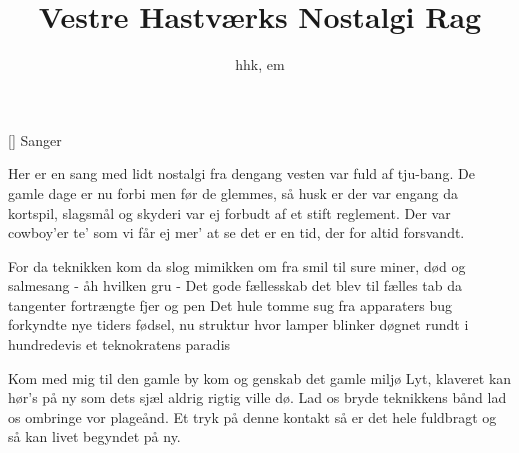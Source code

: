 \documentclass[a4paper,11pt]{article}
\title{Vestre Hastværks Nostalgi Rag}
\author{hhk, em}
\begin{document}
\maketitle

\begin{roles}
  [] Sanger
\end{roles}

\begin{song}
  Her er en sang med lidt nostalgi
  fra dengang vesten var fuld af tju-bang.
  De gamle dage er nu forbi
  men før de glemmes, så husk er der var engang
  da kortspil, slagsmål og skyderi
  var ej forbudt af et stift reglement.
  Der var cowboy'er te'
  som vi får ej mer' at se
  det er en tid, der for altid forsvandt.

  For da teknikken kom
  da slog mimikken om
  fra smil til sure miner, død og salmesang - åh hvilken gru -
  Det gode fællesskab
  det blev til fælles tab
  da tangenter fortrængte fjer og pen
  Det hule tomme sug
  fra apparaters bug
  forkyndte nye tiders fødsel, nu struktur
  hvor lamper blinker døgnet rundt i hundredevis
  et teknokratens paradis

  Kom med mig til den gamle by
  kom og genskab det gamle miljø
  Lyt, klaveret kan hør's på ny
  som dets sjæl aldrig rigtig ville dø.
  Lad os bryde teknikkens bånd
  lad os ombringe vor plageånd.
  Et tryk på denne kontakt
  så er det hele fuldbragt
  og så kan livet begyndet på ny.
\end{song}
\end{document}
